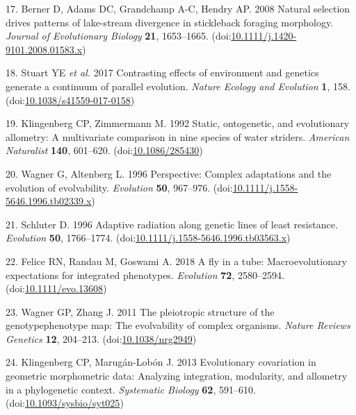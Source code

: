 \documentclass[
  11pt,
]{article}
\begin{document}
\leavevmode\hypertarget{ref-BERNER2008}{}%
17. Berner D, Adams DC, Grandchamp A-C, Hendry AP. 2008 Natural
selection drives patterns of lake-stream divergence in stickleback
foraging morphology. \emph{Journal of Evolutionary Biology} \textbf{21},
1653--1665.
(doi:\href{https://doi.org/10.1111/j.1420-9101.2008.01583.x}{10.1111/j.1420-9101.2008.01583.x})

\leavevmode\hypertarget{ref-Stuart2017}{}%
18. Stuart YE \emph{et al.} 2017 Contrasting effects of environment and
genetics generate a continuum of parallel evolution. \emph{Nature
Ecology and Evolution} \textbf{1}, 158.
(doi:\href{https://doi.org/10.1038/s41559-017-0158}{10.1038/s41559-017-0158})

\leavevmode\hypertarget{ref-Klingenberg1992}{}%
19. Klingenberg CP, Zimmermann M. 1992 Static, ontogenetic, and
evolutionary allometry: A multivariate comparison in nine species of
water striders. \emph{American Naturalist} \textbf{140}, 601--620.
(doi:\href{https://doi.org/10.1086/285430}{10.1086/285430})

\leavevmode\hypertarget{ref-Wagner1996}{}%
20. Wagner G, Altenberg L. 1996 Perspective: Complex adaptations and the
evolution of evolvability. \emph{Evolution} \textbf{50}, 967--976.
(doi:\href{https://doi.org/10.1111/j.1558-5646.1996.tb02339.x}{10.1111/j.1558-5646.1996.tb02339.x})

\leavevmode\hypertarget{ref-Schluter1996}{}%
21. Schluter D. 1996 Adaptive radiation along genetic lines of least
resistance. \emph{Evolution} \textbf{50}, 1766--1774.
(doi:\href{https://doi.org/10.1111/j.1558-5646.1996.tb03563.x}{10.1111/j.1558-5646.1996.tb03563.x})

\leavevmode\hypertarget{ref-Felice2018}{}%
22. Felice RN, Randau M, Goswami A. 2018 A fly in a tube:
Macroevolutionary expectations for integrated phenotypes.
\emph{Evolution} \textbf{72}, 2580--2594.
(doi:\href{https://doi.org/10.1111/evo.13608}{10.1111/evo.13608})

\leavevmode\hypertarget{ref-Wagner2011}{}%
23. Wagner GP, Zhang J. 2011 The pleiotropic structure of the
genotypephenotype map: The evolvability of complex organisms.
\emph{Nature Reviews Genetics} \textbf{12}, 204--213.
(doi:\href{https://doi.org/10.1038/nrg2949}{10.1038/nrg2949})

\leavevmode\hypertarget{ref-Klingenberg2013}{}%
24. Klingenberg CP, Marugán-Lobón J. 2013 Evolutionary covariation in
geometric morphometric data: Analyzing integration, modularity, and
allometry in a phylogenetic context. \emph{Systematic Biology}
\textbf{62}, 591--610.
(doi:\href{https://doi.org/10.1093/sysbio/syt025}{10.1093/sysbio/syt025})
\end{document}
